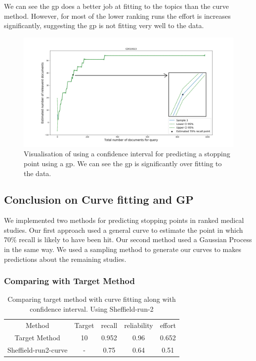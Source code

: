 We can see the gp does a better job at fitting to the topics than the curve method. However, for most of the lower ranking runs the effort is increases significantly, suggesting the gp is not fitting very well to the data.


\begin{figure}[H]
\center
\includegraphics[width=12cm]{figures/joined_graph.png}
\caption{Visualisation of using a confidence interval for predicting a stopping point using a gp. We can see the gp is significantly over fitting to the data.}
\end{figure}


\subsection{Conclusion on Curve fitting and GP}

We implemented two methods for predicting stopping points in ranked medical studies. Our first approach used a general curve to estimate the point in which 70\% recall is likely to have been hit. Our second method used a Gaussian Process in the same way. We used a sampling method to generate our curves to makes predictions about the remaining studies.

\subsubsection{Comparing with Target Method}

\begin{table}[H]

\centering
\begin{tabular}{|c|c|c|c|c|} 
 \hline
 Method & Target & recall & reliability & effort  \\ 

 Target Method & 10 & 0.952 & 0.96 & 0.652 \\
 Sheffield-run2-curve & - & 0.75 & 0.64 & 0.51 \\
 \hline
\end{tabular}
\caption{Comparing target method with curve fitting along with confidence interval. Using Sheffield-run-2}

\end{table}

